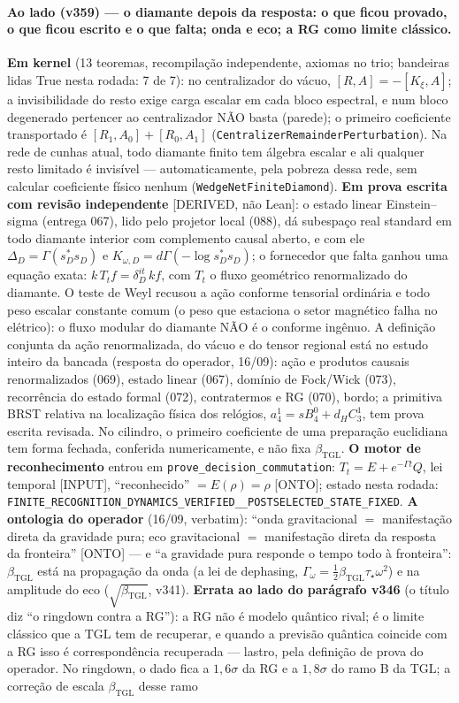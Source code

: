 \documentclass[11pt]{article}
\newcommand{\bTGL}{\beta_{\mathrm{TGL}}}\newcommand{\Msun}{M_{\odot}}\newcommand{\TGL}{\mathrm{TGL}}
\theoremstyle{definition}\newtheorem{deriv}{Derivação}
\begin{document}
\paragraph*{Ao lado (v359) --- o diamante depois da resposta: o que ficou provado, o que ficou escrito e o que falta; onda e eco; a RG como limite clássico.} \textbf{Em kernel} (13 teoremas, recompilação independente, axiomas no trio; bandeiras lidas True nesta rodada: 7 de 7): no centralizador do vácuo, $[R,A]=-[K_\xi,A]$; a invisibilidade do resto exige carga escalar em cada bloco espectral, e num bloco degenerado pertencer ao centralizador NÃO basta (parede); o primeiro coeficiente transportado é $[R_1,A_0]+[R_0,A_1]$ (\texttt{CentralizerRemainderPerturbation}). Na rede de cunhas atual, todo diamante finito tem álgebra escalar e ali qualquer resto limitado é invisível --- automaticamente, pela pobreza dessa rede, sem calcular coeficiente físico nenhum (\texttt{WedgeNetFiniteDiamond}). \textbf{Em prova escrita com revisão independente} [DERIVED, não Lean]: o estado linear Einstein--sigma (entrega 067), lido pelo projetor local (088), dá subespaço real standard em todo diamante interior com complemento causal aberto, e com ele $\Delta_D=\Gamma(s_D^*s_D)$ e $K_{\omega,D}=d\Gamma(-\log s_D^*s_D)$; o fornecedor que falta ganhou uma equação exata: $k\,T_t f=\delta_D^{it}\,k f$, com $T_t$ o fluxo geométrico renormalizado do diamante. O teste de Weyl recusou a ação conforme tensorial ordinária e todo peso escalar constante comum (o peso que estaciona o setor magnético falha no elétrico): o fluxo modular do diamante NÃO é o conforme ingênuo. A definição conjunta da ação renormalizada, do vácuo e do tensor regional está no estudo inteiro da bancada (resposta do operador, 16/09): ação e produtos causais renormalizados (069), estado linear (067), domínio de Fock/Wick (073), recorrência do estado formal (072), contratermos e RG (070), bordo; a primitiva BRST relativa na localização física dos relógios, $a^1_4=sB^0_4+d_HC^1_3$, tem prova escrita revisada. No cilindro, o primeiro coeficiente de uma preparação euclidiana tem forma fechada, conferida numericamente, e não fixa $\bTGL$. \textbf{O motor de reconhecimento} entrou em \texttt{prove\_decision\_commutation}: $T_t=E+e^{-\Gamma t}Q$, lei temporal [INPUT], ``reconhecido'' $=E(\rho)=\rho$ [ONTO]; estado nesta rodada: \texttt{FINITE\_RECOGNITION\_DYNAMICS\_VERIFIED\_\_POSTSELECTED\_STATE\_FIXED}. \textbf{A ontologia do operador} (16/09, verbatim): ``onda gravitacional $=$ manifestação direta da gravidade pura; eco gravitacional $=$ manifestação direta da resposta da fronteira'' [ONTO] --- e ``a gravidade pura responde o tempo todo à fronteira'': $\bTGL$ está na propagação da onda (a lei de dephasing, $\Gamma_\omega=\tfrac12\bTGL\tau_\star\omega^2$) e na amplitude do eco ($\sqrt{\bTGL}$, v341). \textbf{Errata ao lado do parágrafo v346} (o título diz ``o ringdown contra a RG''): a RG não é modelo quântico rival; é o limite clássico que a $\mathrm{TGL}$ tem de recuperar, e quando a previsão quântica coincide com a RG isso é correspondência recuperada --- lastro, pela definição de prova do operador. No ringdown, o dado fica a $1,6\sigma$ da RG e a $1,8\sigma$ do ramo B da $\mathrm{TGL}$; a correção de escala $\bTGL$ desse ramo 
\end{document}
